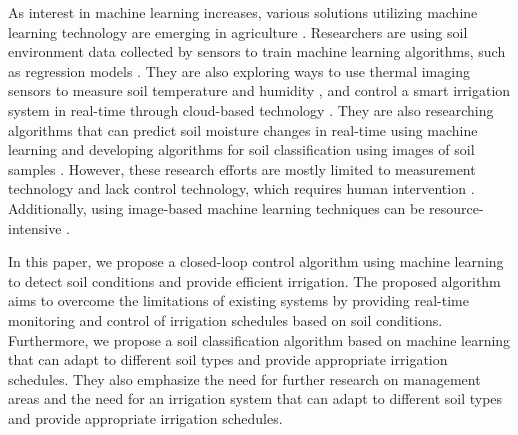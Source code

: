 \documentclass[11pt]{article}
\begin{document}
As interest in machine learning increases, various solutions utilizing machine learning technology are emerging in agriculture \cite{Almeida2018}. Researchers are using soil environment data collected by sensors to train machine learning algorithms, such as regression models \cite{Almeida2018_A}. They are also exploring ways to use thermal imaging sensors to measure soil temperature and humidity \cite{almeida2018thermal}, and control a smart irrigation system in real-time through cloud-based technology \cite{ahmed2018cloud}. They are also researching algorithms that can predict soil moisture changes in real-time using machine learning \cite{almeida2018real} and developing algorithms for soil classification using images of soil samples \cite{almeida2018soil}. However, these research efforts are mostly limited to measurement technology and lack control technology, which requires human intervention \cite{almeida2018limitations}. Additionally, using image-based machine learning techniques can be resource-intensive \cite{ahmed2018resource}.

In this paper, we propose a closed-loop control algorithm using machine learning to detect soil conditions and provide efficient irrigation. The proposed algorithm aims to overcome the limitations of existing systems by providing real-time monitoring and control of irrigation schedules based on soil conditions. Furthermore, we propose a soil classification algorithm based on machine learning that can adapt to different soil types and provide appropriate irrigation schedules. They also emphasize the need for further research on management areas and the need for an irrigation system that can adapt to different soil types and provide appropriate irrigation schedules.



\end{document}
